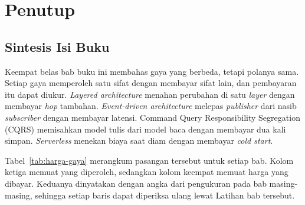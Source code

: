 \chapter{Penutup}
\label{ch:penutup}

\setcounter{chapter}{0}
\setcounter{table}{\value{tabelluarbab}}

\section*{Sintesis Isi Buku}

Keempat belas bab buku ini membahas gaya yang berbeda, tetapi polanya sama.
Setiap gaya memperoleh satu sifat dengan membayar sifat lain, dan pembayaran itu
dapat diukur. \textit{Layered architecture} menahan perubahan di satu
\textit{layer} dengan membayar \textit{hop} tambahan. \textit{Event-driven
architecture} melepas \textit{publisher} dari nasib \textit{subscriber} dengan
membayar latensi. Command Query Responsibility Segregation (CQRS) memisahkan
model tulis dari model baca dengan membayar dua kali simpan. \textit{Serverless}
menekan biaya saat diam dengan membayar \textit{cold start}.

Tabel~\ref{tab:harga-gaya} merangkum pasangan tersebut untuk setiap bab. Kolom
ketiga memuat yang diperoleh, sedangkan kolom keempat memuat harga yang dibayar.
Keduanya dinyatakan dengan angka dari pengukuran pada bab masing-masing,
sehingga setiap baris dapat diperiksa ulang lewat Latihan bab tersebut.

